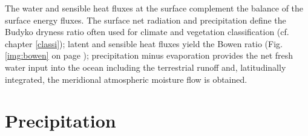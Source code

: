 \documentclass[12pt,a4paper,twoside,openright,headinclude,liststotoc,bibtotoc]{scrreprt}
\begin{document}
The water and sensible heat fluxes at the surface complement the balance of the surface energy fluxes. The surface net radiation and precipitation define the Budyko dryness ratio often used for climate and vegetation classification (cf. chapter \ref{classi}); latent and sensible heat fluxes yield the Bowen ratio (Fig. \ref{img:bowen} on page \pageref{img:bowen}); precipitation minus evaporation provides the net fresh water input into the ocean including the terrestrial runoff and, latitudinally integrated, the meridional atmospheric moisture flow is obtained.

\vspace{-0.4cm}
\section{Precipitation}
\vspace{-0.4cm}
\end{document}
